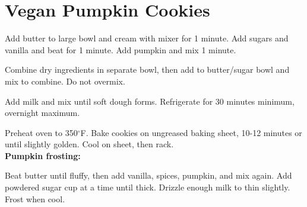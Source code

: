\section{Vegan Pumpkin Cookies}
\begin{recipe}
	
	
	
	Add butter to large bowl and cream with mixer for 1 minute. Add sugars and vanilla and beat for 1 minute. Add pumpkin and mix 1 minute.
	
	Combine dry ingredients in separate bowl, then add to butter/sugar bowl and mix to combine. Do not overmix.
	
	Add milk and mix until soft dough forms. Refrigerate for 30 minutes minimum, overnight maximum.
	
	Preheat oven to 350$^{\circ}$F. Bake cookies on ungreased baking sheet, 10-12 minutes or until slightly golden. Cool on sheet, then rack.\\
	
	\textbf{Pumpkin frosting: }	
	

	Beat butter until fluffy, then add vanilla, spices, pumpkin, and mix again. Add powdered sugar  cup at a time until thick. Drizzle enough milk to thin slightly. Frost when cool.
	
	
\end{recipe}
